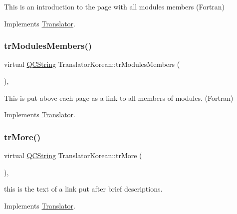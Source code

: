 This is an introduction to the page with all modules members (Fortran) 

Implements \mbox{\hyperlink{class_translator}{Translator}}.

\mbox{\label{class_translator_korean_a7fec794c7eb28db63dd2815204a11cb3}} 
\subsubsection{\texorpdfstring{trModulesMembers()}{trModulesMembers()}}
{\footnotesize\ttfamily virtual \mbox{\hyperlink{class_q_c_string}{Q\+C\+String}} Translator\+Korean\+::tr\+Modules\+Members (\begin{DoxyParamCaption}{ }\end{DoxyParamCaption})\hspace{0.3cm}{\ttfamily [inline]}, {\ttfamily [virtual]}}

This is put above each page as a link to all members of modules. (Fortran) 

Implements \mbox{\hyperlink{class_translator}{Translator}}.

\mbox{\label{class_translator_korean_a076b041b290add4061aec5b517fa4282}} 
\subsubsection{\texorpdfstring{trMore()}{trMore()}}
{\footnotesize\ttfamily virtual \mbox{\hyperlink{class_q_c_string}{Q\+C\+String}} Translator\+Korean\+::tr\+More (\begin{DoxyParamCaption}{ }\end{DoxyParamCaption})\hspace{0.3cm}{\ttfamily [inline]}, {\ttfamily [virtual]}}

this is the text of a link put after brief descriptions. 

Implements \mbox{\hyperlink{class_translator}{Translator}}.

\mbox{\label{class_translator_korean_aa12d74e00aee44683191bb6f0e20b50d}} 
